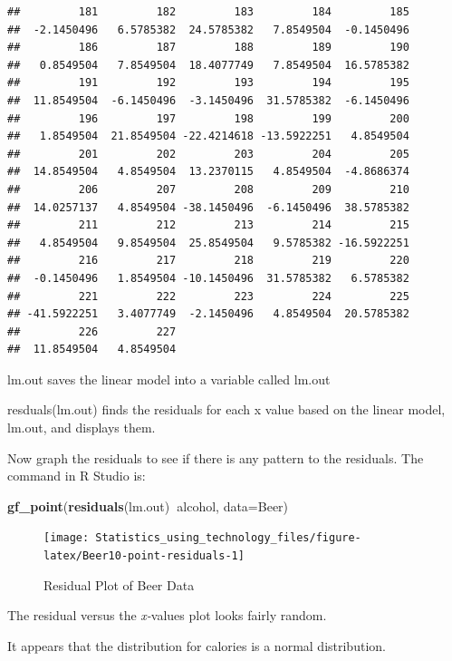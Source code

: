 \documentclass[
]{book}
\newenvironment{Shaded}{\begin{snugshade}}{\end{snugshade}}
\newcommand{\DataTypeTok}[1]{\textcolor[rgb]{0.13,0.29,0.53}{#1}}
\newcommand{\KeywordTok}[1]{\textcolor[rgb]{0.13,0.29,0.53}{\textbf{#1}}}
\newcommand{\NormalTok}[1]{#1}
\newcommand{\OperatorTok}[1]{\textcolor[rgb]{0.81,0.36,0.00}{\textbf{#1}}}
\begin{document}
\begin{verbatim}
##         181         182         183         184         185 
##  -2.1450496   6.5785382  24.5785382   7.8549504  -0.1450496 
##         186         187         188         189         190 
##   0.8549504   7.8549504  18.4077749   7.8549504  16.5785382 
##         191         192         193         194         195 
##  11.8549504  -6.1450496  -3.1450496  31.5785382  -6.1450496 
##         196         197         198         199         200 
##   1.8549504  21.8549504 -22.4214618 -13.5922251   4.8549504 
##         201         202         203         204         205 
##  14.8549504   4.8549504  13.2370115   4.8549504  -4.8686374 
##         206         207         208         209         210 
##  14.0257137   4.8549504 -38.1450496  -6.1450496  38.5785382 
##         211         212         213         214         215 
##   4.8549504   9.8549504  25.8549504   9.5785382 -16.5922251 
##         216         217         218         219         220 
##  -0.1450496   1.8549504 -10.1450496  31.5785382   6.5785382 
##         221         222         223         224         225 
## -41.5922251   3.4077749  -2.1450496   4.8549504  20.5785382 
##         226         227 
##  11.8549504   4.8549504
\end{verbatim}

lm.out saves the linear model into a variable called lm.out

resduals(lm.out) finds the residuals for each x value based on the linear model, lm.out, and displays them.

Now graph the residuals to see if there is any pattern to the residuals. The command in R Studio is:



\begin{Shaded}
\begin{Highlighting}[]
\KeywordTok{gf_point}\NormalTok{(}\KeywordTok{residuals}\NormalTok{(lm.out)}\OperatorTok{~}\NormalTok{alcohol, }\DataTypeTok{data=}\NormalTok{Beer)}
\end{Highlighting}
\end{Shaded}

\begin{figure}
\texttt{[image: Statistics\_using\_technology\_files/figure-latex/Beer10-point-residuals-1]} \caption{Residual Plot of Beer Data}\label{fig:Beer10-point-residuals}
\end{figure}

The residual versus the \emph{x-}values plot looks fairly random.

It appears that the distribution for calories is a normal distribution.
\end{document}
